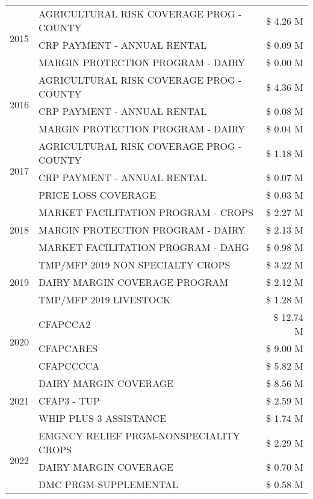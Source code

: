 \begin{tabular}{llr}
\multirow[t]{3}{*}{2015} & AGRICULTURAL RISK COVERAGE PROG - COUNTY & \$ 4.26 M \\
 & CRP PAYMENT - ANNUAL RENTAL & \$ 0.09 M \\
 & MARGIN PROTECTION PROGRAM - DAIRY & \$ 0.00 M \\
\cline{1-3}
\multirow[t]{3}{*}{2016} & AGRICULTURAL RISK COVERAGE PROG - COUNTY & \$ 4.36 M \\
 & CRP PAYMENT - ANNUAL RENTAL & \$ 0.08 M \\
 & MARGIN PROTECTION PROGRAM - DAIRY & \$ 0.04 M \\
\cline{1-3}
\multirow[t]{3}{*}{2017} & AGRICULTURAL RISK COVERAGE PROG - COUNTY & \$ 1.18 M \\
 & CRP PAYMENT - ANNUAL RENTAL & \$ 0.07 M \\
 & PRICE LOSS COVERAGE & \$ 0.03 M \\
\cline{1-3}
\multirow[t]{3}{*}{2018} & MARKET FACILITATION PROGRAM - CROPS & \$ 2.27 M \\
 & MARGIN PROTECTION PROGRAM - DAIRY & \$ 2.13 M \\
 & MARKET FACILITATION PROGRAM - DAHG & \$ 0.98 M \\
\cline{1-3}
\multirow[t]{3}{*}{2019} & TMP/MFP 2019 NON SPECIALTY CROPS & \$ 3.22 M \\
 & DAIRY MARGIN COVERAGE PROGRAM & \$ 2.12 M \\
 & TMP/MFP 2019 LIVESTOCK & \$ 1.28 M \\
\cline{1-3}
\multirow[t]{3}{*}{2020} & CFAPCCA2 & \$ 12.74 M \\
 & CFAPCARES & \$ 9.00 M \\
 & CFAPCCCCA & \$ 5.82 M \\
\cline{1-3}
\multirow[t]{3}{*}{2021} & DAIRY MARGIN COVERAGE & \$ 8.56 M \\
 & CFAP3 - TUP & \$ 2.59 M \\
 & WHIP PLUS 3 ASSISTANCE & \$ 1.74 M \\
\cline{1-3}
\multirow[t]{3}{*}{2022} & EMGNCY RELIEF PRGM-NONSPECIALITY CROPS & \$ 2.29 M \\
 & DAIRY MARGIN COVERAGE & \$ 0.70 M \\
 & DMC PRGM-SUPPLEMENTAL & \$ 0.58 M \\
\cline{1-3}
\bottomrule
\end{tabular}
